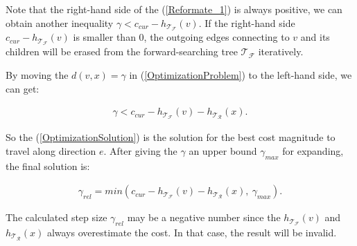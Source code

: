 Note that the right-hand side of the (\ref{Reformate_1}) is always positive,
we can obtain another inequality $\gamma < c_{cur} - h_{\mathcal{T}_{\mathcal{F}}}(v)$.
If the right-hand side $c_{cur} - h_{\mathcal{T}_{\mathcal{F}}}(v)$ is smaller than $0$, the outgoing edges connecting to $v$ and its children will be erased from the forward-searching tree $\mathcal{T}_{\mathcal{F}}$ iteratively.

By moving the $d(v, x) = \gamma$ in (\ref{OptimizationProblem}) to the left-hand side, we can get:

\begin{equation}
\begin{aligned}
\gamma < c_{cur} - h_{\mathcal{T}_{\mathcal{F}}}(v) - h_{\mathcal{T}_{\mathcal{R}}}(x).
\label{OptimizationSolution}
\end{aligned}
\end{equation}

So the (\ref{OptimizationSolution}) is the solution for the best cost magnitude to travel along direction $e$.
After giving the $\gamma$ an upper bound $\gamma_{max}$ for expanding, the final solution is:

\begin{equation}
\begin{aligned}
\gamma_{rel} =
min(c_{cur} - h_{\mathcal{T}_{\mathcal{F}}}(v) - h_{\mathcal{T}_{\mathcal{R}}}(x),\ \gamma_{max} ).
\label{GammaRelevant}
\end{aligned}
\end{equation}



The calculated step size $\gamma_{rel}$ may be a negative number since the $h_{\mathcal{T}_{\mathcal{F}}}(v)$ and $h_{\mathcal{T}_{\mathcal{R}}}(x)$ always overestimate the cost.
In that case, the result will be invalid.




